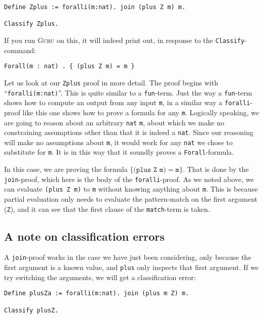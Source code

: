 \documentclass{book}[12pt]
\newcommand{\guru}[0]{\textsc{Guru}\xspace}
\begin{document}
\begin{verbatim}
Define Zplus := foralli(m:nat). join (plus Z m) m.

Classify Zplus.
\end{verbatim}

 \noindent If you run \guru on this, it will indeed print out, in response
to the \texttt{Classify}-command:

\begin{verbatim}
Forall(m : nat) . { (plus Z m) = m }
\end{verbatim}

 \noindent Let us look at our \texttt{Zplus} proof in more detail.
The proof begins with ``\texttt{foralli(m:nat)}''.  This is quite
similar to a \texttt{fun}-term.  Just the way a \texttt{fun}-term
shows how to compute an output from any input \texttt{m}, in a similar
way a \texttt{foralli}-proof like this one shows how to prove a
formula for any \texttt{m}.  Logically speaking, we are going to
reason about an arbitrary \texttt{nat} \texttt{m}, about which we make
no constraining assumptions other than that it is indeed a
\texttt{nat}.  Since our reasoning will make no assumptions about
\texttt{m}, it would work for any \texttt{nat} we chose to substitute
for \texttt{m}.  It is in this way that it soundly proves a
\texttt{Forall}-formula.  

In this case, we are proving the formula $\{ \texttt{(plus Z m)} =
\texttt{m} \}$.  That is done by the \texttt{join}-proof, which here
is the body of the \texttt{foralli}-proof.  As we noted above, we can
evaluate \texttt{(plus Z m)} to \texttt{m} without knowing anything
about \texttt{m}.  This is because partial evaluation only needs to
evaluate the pattern-match on the first argument (\texttt{Z}), and it
can see that the first clause of the \texttt{match}-term is taken.

\subsection{A note on classification errors}
\label{ch3:err}

A \texttt{join}-proof works in the case we have just been considering,
only because the first argument is a known value, and \texttt{plus}
only inspects that first argument.  If we try switching the arguments,
we will get a classification error:

\begin{verbatim}
Define plusZa := foralli(m:nat). join (plus m Z) m.

Classify plusZ.
\end{verbatim}
\end{document}
